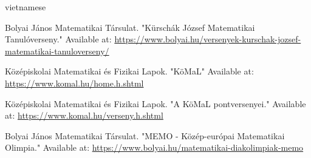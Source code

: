 \documentclass{article}
\begin{document}
\begin{otherlanguage*}{vietnamese}
\begin{thebibliography}{99}
 Bolyai János Matematikai Társulat. "Kürschák József Matematikai Tanulóverseny." Available at: \url{https://www.bolyai.hu/versenyek-kurschak-jozsef-matematikai-tanuloverseny/}

 Középiskolai Matematikai és Fizikai Lapok. "KöMaL" Available at: \url{https://www.komal.hu/home.h.shtml}

 Középiskolai Matematikai és Fizikai Lapok. "A KöMaL pontversenyei." Available at: \url{https://www.komal.hu/verseny.h.shtml}

 Bolyai János Matematikai Társulat. "MEMO - Közép-európai Matematikai Olimpia." Available at: \url{https://www.bolyai.hu/matematikai-diakolimpiak-memo}

\end{thebibliography}

\end{otherlanguage*}
\end{document}
